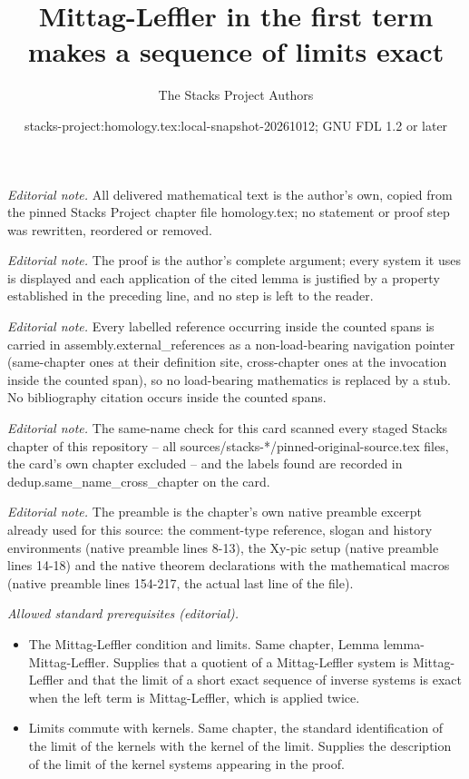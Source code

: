 \documentclass[10pt,a4paper]{amsart}
\title{Mittag-Leffler in the first term makes a sequence of limits exact}
\author{The Stacks Project Authors}
\date{stacks-project:homology.tex:local-snapshot-20261012; GNU FDL 1.2 or later}
\theoremstyle{plain}
\theoremstyle{definition}
\theoremstyle{remark}
\numberwithin{equation}{subsection}
\begin{document}
\maketitle
\noindent\textit{Editorial note.} All delivered mathematical text is the author's own, copied from the pinned Stacks Project chapter file homology.tex; no statement or proof step was rewritten, reordered or removed.\par\medskip
\noindent\textit{Editorial note.} The proof is the author's complete argument; every system it uses is displayed and each application of the cited lemma is justified by a property established in the preceding line, and no step is left to the reader.\par\medskip
\noindent\textit{Editorial note.} Every labelled reference occurring inside the counted spans is carried in assembly.external\_references as a non-load-bearing navigation pointer (same-chapter ones at their definition site, cross-chapter ones at the invocation inside the counted span), so no load-bearing mathematics is replaced by a stub. No bibliography citation occurs inside the counted spans.\par\medskip
\noindent\textit{Editorial note.} The same-name check for this card scanned every staged Stacks chapter of this repository -- all sources/stacks-*/pinned-original-source.tex files, the card's own chapter excluded -- and the labels found are recorded in dedup.same\_name\_cross\_chapter on the card.\par\medskip
\noindent\textit{Editorial note.} The preamble is the chapter's own native preamble excerpt already used for this source: the comment-type reference, slogan and history environments (native preamble lines 8-13), the Xy-pic setup (native preamble lines 14-18) and the native theorem declarations with the mathematical macros (native preamble lines 154-217, the actual last line of the file).\par\medskip
\noindent\textit{Allowed standard prerequisites (editorial).}\begin{itemize}
\item The Mittag-Leffler condition and limits. Same chapter, Lemma lemma-Mittag-Leffler. Supplies that a quotient of a Mittag-Leffler system is Mittag-Leffler and that the limit of a short exact sequence of inverse systems is exact when the left term is Mittag-Leffler, which is applied twice.
\item Limits commute with kernels. Same chapter, the standard identification of the limit of the kernels with the kernel of the limit. Supplies the description of the limit of the kernel systems appearing in the proof.
\end{itemize}\medskip
\end{document}
